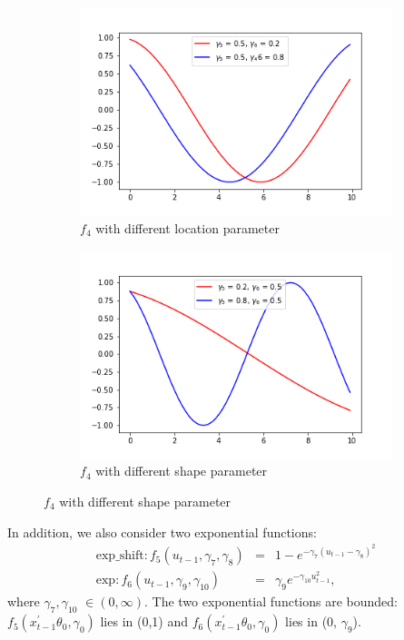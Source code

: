 \documentclass[a4paper,12pt,times,numbered,print,index]{report}
\numberwithin{equation}{section}
\begin{document}
	\begin{figure}[!htbp]
		\centering
		\caption{Plots for Trigonometric Functions}
		\begin{subfigure}[b]{0.44\linewidth}
			\includegraphics[width=\linewidth]{plots/scale_cos_g6.png}
			\caption{$f_{4}$ with different location parameter}
			\label{param_g6}
		\end{subfigure}
		\begin{subfigure}[b]{0.44\linewidth}
			\includegraphics[width=\linewidth]{plots/scale_cos_g5.png}
			\caption{$f_{4}$ with different shape parameter}
			\label{param_g5}
		\end{subfigure}
		\label{trigo}
	\end{figure}
	
	In addition, we also consider two exponential functions:
	\begin{eqnarray*}
		\text{exp\_shift}: f_{5}\left( u_{t-1}, \gamma_{7}, \gamma_{8}\right) &=& 1-e^{-\gamma_{7}\left(u_{t-1}-\gamma_{8}\right)^{2}} \\
		\text{exp}: f_{6}\left( u_{t-1},\gamma _{9}, \gamma_{10}\right) &=& \gamma_{9} e^{-\gamma_{10}u_{t-1}^2},
	\end{eqnarray*} 
	where $\gamma_{7}, \gamma_{10}$ $\in(0, \infty)$. 
	The two exponential functions are bounded: $f_{5}\left(x_{t-1}^{\prime }\theta _{0},\gamma_{0}\right)$ lies in (0,1) and $f_{6}\left(x_{t-1}^{\prime }\theta _{0},\gamma _{0}\right)$ lies in (0, $\gamma_{9}$). 
	
\end{document}
